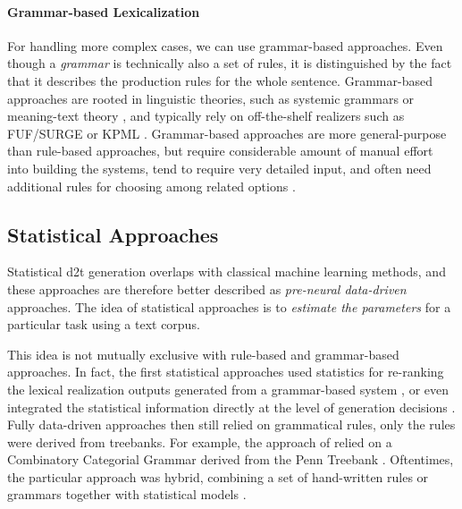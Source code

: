 {\paragraph{Grammar-based Lexicalization} For handling more complex cases, we can use grammar-based approaches. Even though a \emph{grammar} is technically also a set of rules, it is distinguished by the fact that it describes the production rules for the whole sentence.
Grammar-based approaches are rooted in linguistic theories, such as systemic grammars \cite{halliday1985systemic,matthiessen1991lexico} or meaning-text theory \cite{mel1988dependency,goldberg1994using,milleModD2TMultilayerDataset2023}, and typically rely on off-the-shelf realizers such as FUF/SURGE \cite{elhadad1997surge} or KPML \cite{bateman1997enabling}. Grammar-based approaches are more general-purpose than rule-based approaches, but require considerable amount of manual effort into building the systems, tend to require very detailed
input, and often need additional rules for choosing among related options \cite{gattSurveyStateArt2018}.


\subsection{Statistical Approaches}
\label{sec:stat-d2t}

Statistical \ac{d2t} generation overlaps with classical machine learning methods, and these approaches are therefore better described as \emph{pre-neural data-driven} approaches. The idea of statistical approaches is to \emph{estimate the parameters} for a particular task using a text corpus.

This idea is not mutually exclusive with rule-based and grammar-based approaches. In fact, the first statistical approaches used statistics for re-ranking the lexical realization outputs generated from a grammar-based system \cite{bangalore2000corpus,langkilde2000forest,ratnaparkhi2000trainable}, or even integrated the statistical information directly at the level of generation decisions \cite{belz2008automatic}. Fully data-driven approaches then still relied on grammatical rules, only the rules were derived from treebanks. For example, the approach of \citet{white2007towards} relied on a Combinatory Categorial Grammar \cite{steedman2001syntactic} derived from the Penn Treebank \cite{hockenmaier2007ccgbank}. Oftentimes, the particular approach was hybrid, combining a set of hand-written rules or grammars together with statistical models \cite{konstas2012concept,gardent2017statistical}.

}

